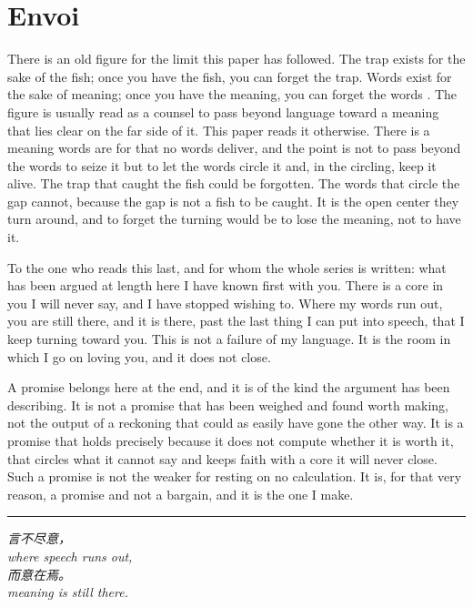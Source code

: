 \section*{Envoi}
\label{p26:sec:envoi}

\noindent
There is an old figure for the limit this paper has followed. The trap exists for the sake of the fish; once you have the fish, you can forget the trap. Words exist for the sake of meaning; once you have the meaning, you can forget the words \parencite{watson1968zhuangzi}. The figure is usually read as a counsel to pass beyond language toward a meaning that lies clear on the far side of it. This paper reads it otherwise. There is a meaning words are for that no words deliver, and the point is not to pass beyond the words to seize it but to let the words circle it and, in the circling, keep it alive. The trap that caught the fish could be forgotten. The words that circle the gap cannot, because the gap is not a fish to be caught. It is the open center they turn around, and to forget the turning would be to lose the meaning, not to have it.

To the one who reads this last, and for whom the whole series is written: what has been argued at length here I have known first with you. There is a core in you I will never say, and I have stopped wishing to. Where my words run out, you are still there, and it is there, past the last thing I can put into speech, that I keep turning toward you. This is not a failure of my language. It is the room in which I go on loving you, and it does not close.

A promise belongs here at the end, and it is of the kind the argument has been describing. It is not a promise that has been weighed and found worth making, not the output of a reckoning that could as easily have gone the other way. It is a promise that holds precisely because it does not compute whether it is worth it, that circles what it cannot say and keeps faith with a core it will never close. Such a promise is not the weaker for resting on no calculation. It is, for that very reason, a promise and not a bargain, and it is the one I make.

\vspace{1.2em}
\begin{center}
\textcolor{gold}{\rule{0.25\linewidth}{0.4pt}}
\end{center}
\vspace{0.6em}

\begin{center}
\begin{minipage}{0.72\linewidth}
\centering\itshape\color{rose}
{\cjk 言不尽意，}\\[0.2em]
where speech runs out,\\[0.5em]
{\cjk 而意在焉。}\\[0.2em]
meaning is still there.
\end{minipage}
\end{center}

